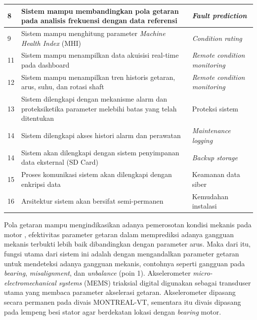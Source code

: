 \documentclass{elsinta}
\begin{document}
\begin{longtable}{|p{1.5cm}|p{7cm}|p{5cm}|}
    8 
    & Sistem mampu membandingkan pola getaran
    pada analisis frekuensi dengan data referensi
    & \textit{Fault prediction} \\
    \hline

    9 
    & Sistem mampu menghitung parameter
    \textit{Machine Health Index} (MHI) 
    & \textit{Condition rating} \\
    \hline

    11
    & Sistem mampu menampilkan data akuisisi real-time pada 
    dashboard 
    & \textit{Remote condition monitoring} \\
    \hline

    12 
    & Sistem mampu menampilkan tren historis getaran, arus, 
    suhu, dan rotasi shaft 
    & \textit{Remote condition monitoring} \\
    \hline

    13
    & Sistem dilengkapi dengan mekanisme
    alarm dan proteksiketika parameter 
    melebihi batas yang telah ditentukan 
    & Proteksi sistem \\
    \hline

    14 
    & Sistem dilengkapi akses histori
    alarm dan perawatan 
    & \textit{Maintenance logging} \\
    \hline

    14 
    & Sistem akan dilengkapi dengan sistem
    penyimpanan data eksternal (SD Card)
    & \textit{Backup storage}\\
    \hline

    15
    & Proses komunikasi sistem akan dilengkapi dengan enkripsi data
    & Keamanan data siber\\
    \hline

    16
    & Arsitektur sistem akan bersifat semi-permanen
    & Kemudahan instalasi\\
    \hline

\end{longtable}

Pola getaran mampu mengindikasikan adanya pemerosotan kondisi mekanis pada motor \cite{VishnuKvAnoopBk2015},
efektivitas parameter getaran dalam memprediksi adanya gangguan mekanis terbukti
lebih baik dibandingkan dengan parameter arus\cite{Ayankoso2026}. Maka dari itu, fungsi utama
dari sistem ini adalah dengan mengandalkan parameter getaran untuk mendeteksi adanya gangguan mekanis,
contohnya seperti gangguan pada \textit{bearing}, \textit{misalignment}, dan \textit{unbalance} (poin 1). Akselerometer
\textit{micro-electromechanical systems} (MEMS) triaksial
digital digunakan sebagai transduser utama yang membaca parameter akselerasi getaran.
Akselerometer dipasang secara permanen pada divais MONTREAL-VT, sementara itu divais 
dipasang pada lempeng besi stator agar berdekatan lokasi dengan \textit{bearing} 
motor\cite{InternationalOrganizationforStandardization2002}.
\end{document}
